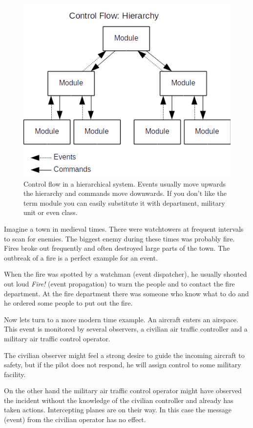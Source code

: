 \begin{figure}[ht]
\centering
\includegraphics[width=12cm]{img/controlflowhierarchy.png}
\caption{Control flow in a hierarchical system. Events usually move
upwards the hierarchy and commands move downwards. If you don't like
the term module you can easily substitute it with department,
military unit or even class. }
\end{figure}

Imagine a town in medieval times. There were watchtowers at frequent
intervals to scan for enemies. The biggest enemy during these times was
probably fire. Fires broke out frequently and often destroyed large
parts of the town. The outbreak of a fire is a perfect example for an
event.

When the fire was spotted by a watchman (event dispatcher), he usually
shouted out loud \emph{Fire!} (event propagation) to warn the people and
to contact the fire department. At the fire department there was someone
who know what to do and he ordered some people to put out the fire.

Now lets turn to a more modern time example. An aircraft enters an
airspace. This event is monitored by several observers, a civilian air
traffic controller and a military air traffic control operator.

The civilian observer might feel a strong desire to guide the incoming
aircraft to safety, but if the pilot does not respond, he will assign
control to some military facility.

On the other hand the military air traffic control operator might have
observed the incident without the knowledge of the civilian controller
and already has taken actions. Intercepting planes are on their way. In
this case the message (event) from the civilian operator has no effect.

